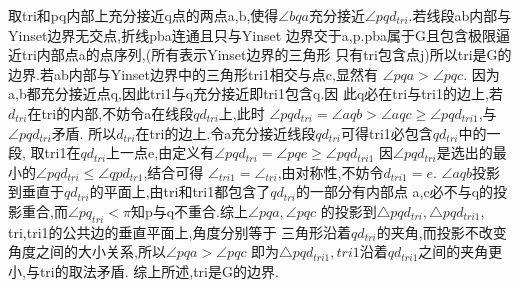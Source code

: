 \documentclass[a4paper]{book}
\numberwithin{equation}{chapter}
\theoremstyle{definition}
\begin{document}
取tri和pq内部上充分接近q点的两点a,b,使得$\angle bqa$充分接近$\angle pqd_{tri}$.若线段ab内部与Yinset边界无交点,折线pba连通且只与Yinset
边界交于a,p.pba属于G且包含极限逼近tri内部点a的点序列,(所有表示Yinset边界的三角形
只有tri包含点j)所以tri是G的边界.若ab内部与Yinset边界中的三角形tri1相交与点c,显然有
$\angle pqa > \angle pqc$.
因为a,b都充分接近点q,因此tri1与q充分接近即tri1包含q.因
此q必在tri与tri1的边上,若$d_{tri}$在tri的内部,不妨令a在线段$qd_{tri}$上,此时
$\angle pqd_{tri} = \angle aqb > \angle aqc \geq \angle pqd_{tri1}$,与$\angle pqd_{tri}$矛盾.
所以$d_{tri}$在tri的边上.令a充分接近线段$qd_{tri}$可得tri1必包含$qd_{tri}$中的一段,
取tri1在$qd_{tri}$上一点e,由定义有$\angle pqd_{tri} = \angle pqe \geq \angle pqd_{tri1}$
因$\angle pqd_{tri}$是选出的最小的$\angle pqd_{tri} \leq \angle qpd_{tr1}$,结合可得
$\angle_{tri1} = \angle_{tri}$,由对称性,不妨令$d_{tri1} = e$.
$\angle aqb$投影到垂直于$qd_{tri}$的平面上,由tri和tri1都包含了$qd_{tri}$的一部分有内部点
a,c必不与q的投影重合,而$\angle pq_{tri} < \pi$知p与q不重合.综上$\angle pqa,\angle pqc$
的投影到$\triangle pqd_{tri}, \triangle pqd_{tri1}$, tri,tri1的公共边的垂直平面上,角度分别等于
三角形沿着$qd_{tri}$的夹角,而投影不改变角度之间的大小关系,所以$\angle pqa > \angle pqc$
即为$\triangle pqd_{tri1}, tri1$沿着$qd_{tri1}$之间的夹角更小,与tri的取法矛盾.
综上所述,tri是G的边界.
\end{document}
